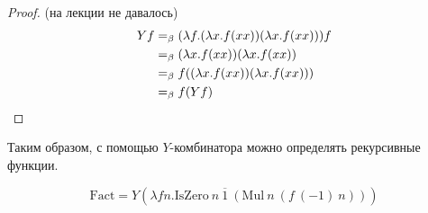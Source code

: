 \begin{proof} (на лекции не давалось)
    \begin{align*}
        Yf &=_{\beta} (\lambda f . (\lambda x . f (x x)) (\lambda x . f (x x))) f \\
           &=_{\beta} (\lambda x . f (x x)) (\lambda x . f (x x)) \\
           &=_{\beta} f ((\lambda x . f (x x)) (\lambda x . f (x x))) \\
           &=_{\beta} f (Y f)
    \qedhere
    \end{align*}
\end{proof}

Таким образом, с помощью $Y$-комбинатора можно определять рекурсивные функции.
\begin{example}
    \[
        \mathrm{Fact} = Y (\lambda{} f n . \mathrm{IsZero}\ n\ \overline{1}\ (\mathrm{Mul}\ n\ (f\ (-1)\ n)))
    \]
\end{example}
